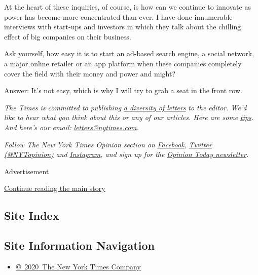 At the heart of these inquiries, of course, is how can we continue to
innovate as power has become more concentrated than ever. I have done
innumerable interviews with start-ups and investors in which they talk
about the chilling effect of big companies on their business.

Ask yourself, how easy it is to start an ad-based search engine, a
social network, a major online retailer or an app platform when these
companies completely cover the field with their money and power and
might?

Answer: It's not easy, which is why I will try to grab a seat in the
front row.

\emph{The Times is committed to publishing}
\href{https://www.nytimes.com/2019/01/31/opinion/letters/letters-to-editor-new-york-times-women.html}{\emph{a
diversity of letters}} \emph{to the editor. We'd like to hear what you
think about this or any of our articles. Here are some}
\href{https://help.nytimes.com/hc/en-us/articles/115014925288-How-to-submit-a-letter-to-the-editor}{\emph{tips}}\emph{.
And here's our email:}
\href{mailto:letters@nytimes.com}{\emph{letters@nytimes.com}}\emph{.}

\emph{Follow The New York Times Opinion section on}
\href{https://www.facebook.com/nytopinion}{\emph{Facebook}}\emph{,}
\href{http://twitter.com/NYTOpinion}{\emph{Twitter (@NYTopinion)}}
\emph{and}
\href{https://www.instagram.com/nytopinion/}{\emph{Instagram}}\emph{,
and sign up for the}
\href{http://www.nytimes.com/newsletters/opiniontoday/}{\emph{Opinion
Today newsletter}}\emph{.}

Advertisement

\protect\hyperlink{after-bottom}{Continue reading the main story}

\hypertarget{site-index}{%
\subsection{Site Index}\label{site-index}}

\hypertarget{site-information-navigation}{%
\subsection{Site Information
Navigation}\label{site-information-navigation}}

\begin{itemize}
\tightlist
\item
  \href{https://help.nytimes.com/hc/en-us/articles/115014792127-Copyright-notice}{©~2020~The
  New York Times Company}
\end{itemize}

